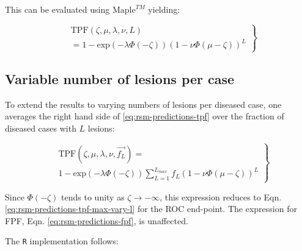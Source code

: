 \documentclass[
]{book}
\begin{document}
This can be evaluated using \(\text{Maple}^{TM}\) yielding:

\begin{equation}
\left.
\begin{aligned}
& \text{TPF}\left (\zeta , \mu, \lambda, \nu, L \right ) \\
&= 1 - \text{exp}\left ( - \lambda \Phi \left ( - \zeta \right )\right )
\left ( 1 - \nu \Phi \left ( \mu - \zeta \right ) \right )^L
\end{aligned}
\right \}
\label{eq:rsm-predictions-tpf}
\end{equation}

\hypertarget{rsm-predictions-tpf-varying-lesions}{%
\subsection{Variable number of lesions per case}\label{rsm-predictions-tpf-varying-lesions}}

To extend the results to varying numbers of lesions per diseased case, one averages the right hand side of \eqref{eq:rsm-predictions-tpf} over the fraction of diseased cases with \(L\) lesions:

\begin{equation}
\left.
\begin{aligned}
& \text{TPF}\left (\zeta , \mu, \lambda, \nu, \overrightarrow{f_L} \right ) =  \\
& 1 - \text{exp}\left ( -\lambda \Phi \left ( -\zeta \right )\right ) 
\sum_{L=1}^{L_{max}} f_L  \left ( 1 - \nu \Phi \left ( \mu -\zeta \right ) \right )^L 
\end{aligned}
\right \}
\label{eq:rsm-predictions-tpf2}
\end{equation}

Since \(\Phi \left ( -\zeta \right )\) tends to unity as \(\zeta \rightarrow -\infty\), this expression reduces to Eqn. \eqref{eq:rsm-predictions-tpf-max-vary-l} for the ROC end-point. The expression for FPF, Eqn. \eqref{eq:rsm-predictions-fpf}, is unaffected.

The \texttt{R} implementation follows:
\end{document}
